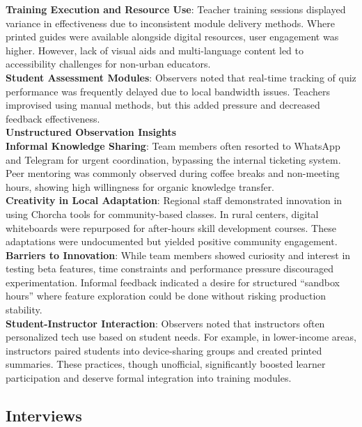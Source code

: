\documentclass[12pt,a4paper,oneside]{book}
\begin{document}
\textbf{Training Execution and Resource Use}: Teacher training sessions displayed variance in effectiveness due to inconsistent module delivery methods. Where printed guides were available alongside digital resources, user engagement was higher. However, lack of visual aids and multi-language content led to accessibility challenges for non-urban educators.\\

\textbf{Student Assessment Modules}: Observers noted that real-time tracking of quiz performance was frequently delayed due to local bandwidth issues. Teachers improvised using manual methods, but this added pressure and decreased feedback effectiveness.\\

\textbf{Unstructured Observation Insights} \\

\textbf{Informal Knowledge Sharing}: Team members often resorted to WhatsApp and Telegram for urgent coordination, bypassing the internal ticketing system. Peer mentoring was commonly observed during coffee breaks and non-meeting hours, showing high willingness for organic knowledge transfer.\\

\textbf{Creativity in Local Adaptation}: Regional staff demonstrated innovation in using Chorcha tools for community-based classes. In rural centers, digital whiteboards were repurposed for after-hours skill development courses. These adaptations were undocumented but yielded positive community engagement.\\

\textbf{Barriers to Innovation}: While team members showed curiosity and interest in testing beta features, time constraints and performance pressure discouraged experimentation. Informal feedback indicated a desire for structured “sandbox hours” where feature exploration could be done without risking production stability.\\

\textbf{Student-Instructor Interaction}: Observers noted that instructors often personalized tech use based on student needs. For example, in lower-income areas, instructors paired students into device-sharing groups and created printed summaries. These practices, though unofficial, significantly boosted learner participation and deserve formal integration into training modules.

\subsection{Interviews}
\end{document}
